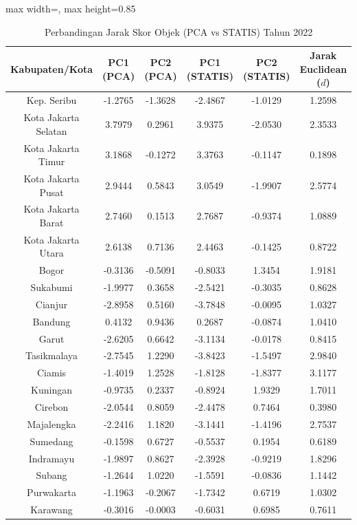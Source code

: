 \begin{table}[H]
\centering
\caption{Perbandingan Jarak Skor Objek (PCA vs STATIS) Tahun 2022} \label{tab:app1jarak_skor_2022}
\begin{adjustbox}{max width=\textwidth, max height=0.85\textheight}
\begin{tabular}{|c|c|c|c|c|c|}
\hline
\textbf{Kabupaten/Kota} & \textbf{PC1 (PCA)} & \textbf{PC2 (PCA)} & \textbf{PC1 (STATIS)} & \textbf{PC2 (STATIS)} & \textbf{Jarak Euclidean ($d$)} \\
\hline
Kep. Seribu & -1.2765 & -1.3628 & -2.4867 & -1.0129 & 1.2598 \\
Kota Jakarta Selatan & 3.7979 & 0.2961 & 3.9375 & -2.0530 & 2.3533 \\
Kota Jakarta Timur & 3.1868 & -0.1272 & 3.3763 & -0.1147 & 0.1898 \\
Kota Jakarta Pusat & 2.9444 & 0.5843 & 3.0549 & -1.9907 & 2.5774 \\
Kota Jakarta Barat & 2.7460 & 0.1513 & 2.7687 & -0.9374 & 1.0889 \\
Kota Jakarta Utara & 2.6138 & 0.7136 & 2.4463 & -0.1425 & 0.8722 \\
Bogor & -0.3136 & -0.5091 & -0.8033 & 1.3454 & 1.9181 \\
Sukabumi & -1.9977 & 0.3658 & -2.5421 & -0.3035 & 0.8628 \\
Cianjur & -2.8958 & 0.5160 & -3.7848 & -0.0095 & 1.0327 \\
Bandung & 0.4132 & 0.9436 & 0.2687 & -0.0874 & 1.0410 \\
Garut & -2.6205 & 0.6642 & -3.1134 & -0.0178 & 0.8415 \\
Tasikmalaya & -2.7545 & 1.2290 & -3.8423 & -1.5497 & 2.9840 \\
Ciamis & -1.4019 & 1.2528 & -1.8128 & -1.8377 & 3.1177 \\
Kuningan & -0.9735 & 0.2337 & -0.8924 & 1.9329 & 1.7011 \\
Cirebon & -2.0544 & 0.8059 & -2.4478 & 0.7464 & 0.3980 \\
Majalengka & -2.2416 & 1.1820 & -3.1441 & -1.4196 & 2.7537 \\
Sumedang & -0.1598 & 0.6727 & -0.5537 & 0.1954 & 0.6189 \\
Indramayu & -1.9897 & 0.8627 & -2.3928 & -0.9219 & 1.8296 \\
Subang & -1.2644 & 1.0220 & -1.5591 & -0.0836 & 1.1442 \\
Purwakarta & -1.1963 & -0.2067 & -1.7342 & 0.6719 & 1.0302 \\
Karawang & -0.3016 & -0.0003 & -0.6031 & 0.6985 & 0.7611 \\

\end{tabular}
\end{adjustbox}
\end{table}
